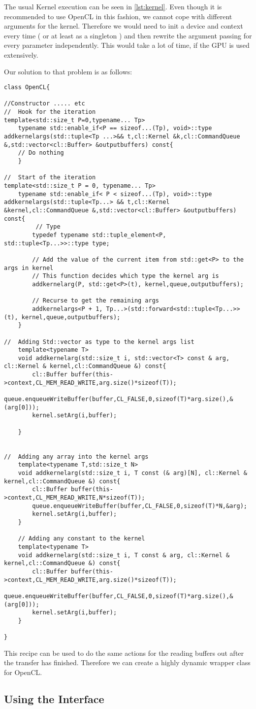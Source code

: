 The usual Kernel execution can be seen in \ref{lst:kernel}. Even though it is recommended to use OpenCL in this fashion, we cannot cope with different arguments for the kernel. Therefore we would need to init a device and context every time ( or at least as a singleton ) and then rewrite the argument passing for every parameter independently. This would take a lot of time, if the GPU is used extensively.

Our solution to that problem is as follows:

\begin{lstlisting}[caption=Add arguments to kernel dynamic way]
class OpenCL{

//Constructor ..... etc
//	Hook for the iteration
template<std::size_t P=0,typename... Tp>
	typename std::enable_if<P == sizeof...(Tp), void>::type addkernelargs(std::tuple<Tp ...>&& t,cl::Kernel &k,cl::CommandQueue &,std::vector<cl::Buffer> &outputbuffers) const{
	// Do nothing
	}
	
//  Start of the iteration
template<std::size_t P = 0, typename... Tp>
	typename std::enable_if< P < sizeof...(Tp), void>::type addkernelargs(std::tuple<Tp...> && t,cl::Kernel &kernel,cl::CommandQueue &,std::vector<cl::Buffer> &outputbuffers) const{
		 // Type
        typedef typename std::tuple_element<P, std::tuple<Tp...>>::type type;

        // Add the value of the current item from std::get<P> to the args in kernel
        // This function decides which type the kernel arg is
        addkernelarg(P, std::get<P>(t), kernel,queue,outputbuffers);

        // Recurse to get the remaining args
        addkernelargs<P + 1, Tp...>(std::forward<std::tuple<Tp...>>(t), kernel,queue,outputbuffers);
	}
	
//	Adding Std::vector as type to the kernel args list
	template<typename T>
	void addkernelarg(std::size_t i, std::vector<T> const & arg, cl::Kernel & kernel,cl::CommandQueue &) const{
		cl::Buffer buffer(this->context,CL_MEM_READ_WRITE,arg.size()*sizeof(T));
		queue.enqueueWriteBuffer(buffer,CL_FALSE,0,sizeof(T)*arg.size(),&(arg[0]));
		kernel.setArg(i,buffer);
	
	}


//	Adding any array into the kernel args
	template<typename T,std::size_t N>
	void addkernelarg(std::size_t i, T const (& arg)[N], cl::Kernel & kernel,cl::CommandQueue &) const{
		cl::Buffer buffer(this->context,CL_MEM_READ_WRITE,N*sizeof(T));
		queue.enqueueWriteBuffer(buffer,CL_FALSE,0,sizeof(T)*N,&arg);
		kernel.setArg(i,buffer);
	}
	
	// Adding any constant to the kernel
	template<typename T>
	void addkernelarg(std::size_t i, T const & arg, cl::Kernel & kernel,cl::CommandQueue &) const{
		cl::Buffer buffer(this->context,CL_MEM_READ_WRITE,arg.size()*sizeof(T));
		queue.enqueueWriteBuffer(buffer,CL_FALSE,0,sizeof(T)*arg.size(),&(arg[0]));
		kernel.setArg(i,buffer);
	}

}
\end{lstlisting}

This recipe can be used to do the same actions for the reading buffers out after the transfer has finished.
Therefore we can create a highly dynamic wrapper class for OpenCL.

\subsection{Using the Interface}

